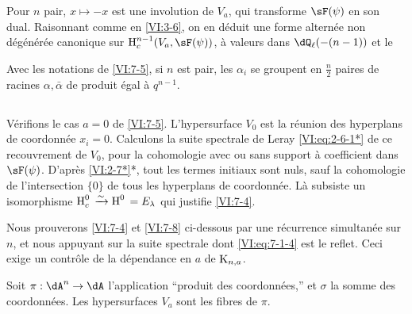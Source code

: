 Pour $n$ pair, $x\mapsto -x$ est une involution de $V_a$, qui transforme 
$\sF(\psi)$ en son dual. Raisonnant comme en \ref{VI:3-6}, on en déduit une 
forme alternée non dégénérée canonique sur $\h_c^{n-1}(V_a,\sF(\psi))$, 
à valeurs dans $\dQ_\ell(-(n-1))$ et le 





\begin{corollary_}\label{VI:7-6}
Avec les notations de \ref{VI:7-5}, si $n$ est pair, les $\alpha_i$ se groupent 
en $\frac n 2$ paires de racines $\alpha,\bar\alpha$ de produit égal à 
$q^{n-1}$. 
\end{corollary_}





\subsection{}\label{VI:7-7}

Vérifions le cas $a=0$ de \ref{VI:7-5}. L'hypersurface $V_0$ est la réunion 
des hyperplans de coordonnée $x_i=0$. Calculons la suite spectrale de Leray 
\eqref{VI:eq:2-6-1*} de ce recouvrement de $V_0$, pour la cohomologie avec ou 
sans support à coefficient dans $\sF(\psi)$. D'après \ref{VI:2-7*}*, tout 
les termes initiaux sont nuls, sauf la cohomologie de l'intersection $\{0\}$ de 
tous les hyperplans de coordonnée. Là subsiste un isomorphisme 
$\operatorname{H}_c^0{}\xrightarrow\sim \operatorname{H}^0{}=E_\lambda$ qui justifie \ref{VI:7-4}. 

Nous prouverons \ref{VI:7-4} et \ref{VI:7-8} ci-dessous par une récurrence 
simultanée sur $n$, et nous appuyant sur la suite spectrale dont 
\eqref{VI:eq:7-1-4} est le reflet. Ceci exige un contrôle de la dépendance 
en $a$ de $\textnormal{K}_{n,a}$. 

Soit $\pi:\dA^n \to \dA$ l'application ``produit des coordonnées,'' et 
$\sigma$ la somme des coordonnées. Les hypersurfaces $V_a$ sont les fibres de 
$\pi$. 





